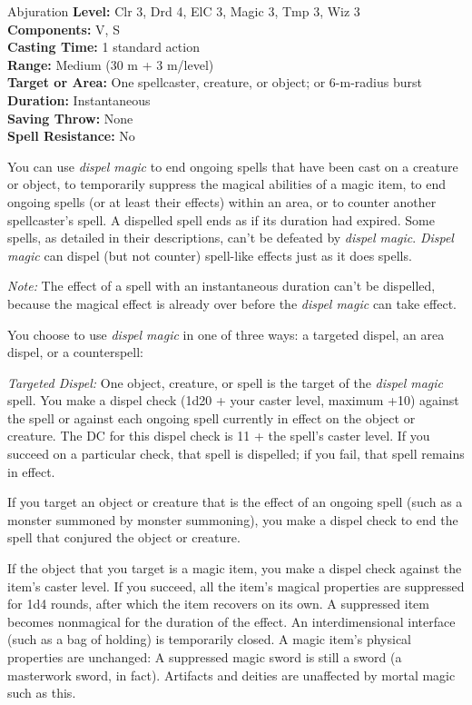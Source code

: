 {Abjuration}
{
	\textbf{Level:}
	Clr 3, Drd 4, ElC 3, Magic 3, Tmp 3, Wiz 3\\
	\textbf{Components:}
	V, S\\
	\textbf{Casting Time:}
	1 standard action\\
	\textbf{Range:}
	Medium (30 m + 3 m/level)\\
	\textbf{Target or Area:}
	One spellcaster, creature, or object; or 6-m-radius burst\\
	\textbf{Duration:}
	Instantaneous\\
	\textbf{Saving Throw:}
	None\\
	\textbf{Spell Resistance:}
	No\\
}
{
	You can use \emph{dispel magic} to end ongoing spells that have been cast on a creature or object, to temporarily suppress the magical abilities of a magic item, to end ongoing spells (or at least their effects) within an area, or to counter another spellcaster's spell. A dispelled spell ends as if its duration had expired. Some spells, as detailed in their descriptions, can't be defeated by \emph{dispel magic}. \emph{Dispel magic} can dispel (but not counter) spell-like effects just as it does spells.

	\textit{Note:} The effect of a spell with an instantaneous duration can't be dispelled, because the magical effect is already over before the \emph{dispel magic} can take effect.

	You choose to use \emph{dispel magic} in one of three ways: a targeted dispel, an area dispel, or a counterspell:

	\textit{Targeted Dispel:}
	One object, creature, or spell is the target of the \emph{dispel magic} spell. You make a dispel check (1d20 + your caster level, maximum +10) against the spell or against each ongoing spell currently in effect on the object or creature. The DC for this dispel check is 11 + the spell's caster level. If you succeed on a particular check, that spell is dispelled; if you fail, that spell remains in effect.

	If you target an object or creature that is the effect of an ongoing spell (such as a monster summoned by monster summoning), you make a dispel check to end the spell that conjured the object or creature.

	If the object that you target is a magic item, you make a dispel check against the item's caster level. If you succeed, all the item's magical properties are suppressed for 1d4 rounds, after which the item recovers on its own. A suppressed item becomes nonmagical for the duration of the effect. An interdimensional interface (such as a bag of holding) is temporarily closed. A magic item's physical properties are unchanged: A suppressed magic sword is still a sword (a masterwork sword, in fact). Artifacts and deities are unaffected by mortal magic such as this.

}
